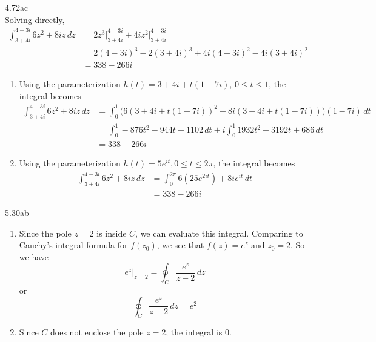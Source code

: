 \documentclass{article}
\theoremstyle{definition}
\begin{document}
	\begin{prob}{4.72ac} $  $ \vspace{2mm} \\
		Solving directly,
		\begin{align*}
			\int_{3+4i}^{4-3i} 6z^2 + 8iz \, dz &= 2z^3 \Big|_{3+4i}^{4-3i} + 4iz^2 \Big|_{3+4i}^{4-3i} \\ 
			&= 2(4-3i)^3 - 2(3+4i)^3 + 4i(4-3i)^2 - 4i(3+4i)^2 \\
			&= 338 - 266i
		\end{align*}
		\begin{enumerate}[label=\alph*.)]
			\item Using the parameterization $ h(t) = 3+4i + t(1-7i) $, $ 0 \leq t \leq 1 $, the integral becomes
				\begin{align*}
					\int_{3+4i}^{4-3i} 6z^2 + 8iz \, dz &= \int_{0}^{1} \big( 6( 3+4i + t(1-7i))^2 + 8i(3+4i+t(1-7i)) \big) (1-7i) \, dt \\
					&= \int_{0}^{1} -876t^2 - 944t + 1102 \, dt + i \int_{0}^{1} 1932t^2 - 3192t + 686 \, dt \\
					&= 338 - 266i
				\end{align*}
			\addtocounter{enumi}{1}
			\item Using the parameterization $ h(t) = 5e^{it}, 0 \leq t \leq 2\pi $, the integral becomes
				\begin{align*}
					\int_{3+4i}^{4-3i} 6z^2 + 8iz \, dz &= \int_{0}^{2\pi} 6 \left( 25e^{2it} \right) + 8ie^{it} \, dt \\
					&= 338 - 266i
				\end{align*}
		\end{enumerate}
	\end{prob}
	
	
	
	
	\begin{prob}{5.30ab} $  $
		\begin{enumerate}[label=\alph*.)]
			\item Since the pole $ z = 2 $ is inside $ C $, we can evaluate this integral. Comparing to Cauchy's integral formula for $ f(z_0) $, we see that $ f(z) = e^z $ and $ z_0 = 2 $. So we have 
				\[
					e^{z} \Big|_{z=2} = \oint_C \frac{e^z}{z-2} \, dz
				\]
			or
				\[
					\oint_C \frac{e^z}{z-2} \, dz = e^2
				\]
			\item Since $ C $ does not enclose the pole $ z=2 $, the integral is 0. \\
		\end{enumerate}
	\end{prob}
\end{document}
